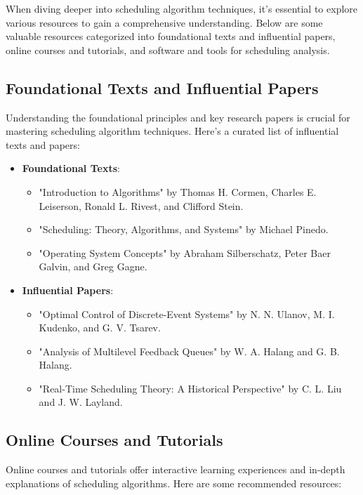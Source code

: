 \documentclass[12pt]{book} %
\begin{document}
When diving deeper into scheduling algorithm techniques, it's essential to explore various resources to gain a comprehensive understanding. Below are some valuable resources categorized into foundational texts and influential papers, online courses and tutorials, and software and tools for scheduling analysis.

\subsection{Foundational Texts and Influential Papers}

Understanding the foundational principles and key research papers is crucial for mastering scheduling algorithm techniques. Here's a curated list of influential texts and papers:

\begin{itemize}
    \item \textbf{Foundational Texts}:
    \begin{itemize}
        \item "Introduction to Algorithms" by Thomas H. Cormen, Charles E. Leiserson, Ronald L. Rivest, and Clifford Stein.
        \item "Scheduling: Theory, Algorithms, and Systems" by Michael Pinedo.
        \item "Operating System Concepts" by Abraham Silberschatz, Peter Baer Galvin, and Greg Gagne.
    \end{itemize}
    
    \item \textbf{Influential Papers}:
    \begin{itemize}
        \item "Optimal Control of Discrete-Event Systems" by N. N. Ulanov, M. I. Kudenko, and G. V. Tsarev.
        \item "Analysis of Multilevel Feedback Queues" by W. A. Halang and G. B. Halang.
        \item "Real-Time Scheduling Theory: A Historical Perspective" by C. L. Liu and J. W. Layland.
    \end{itemize}
\end{itemize}

\subsection{Online Courses and Tutorials}

Online courses and tutorials offer interactive learning experiences and in-depth explanations of scheduling algorithms. Here are some recommended resources:
\end{document}
